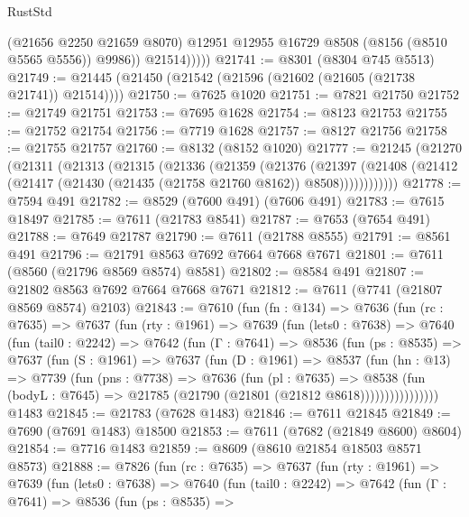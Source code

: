 \begin{lexlean}{RustStd}
\begin{coremodule}
                  (@21656 @2250 @21659 @8070)
                  @12951
                  @12955
                  @16729
                  @8508
                  (@8156 (@8510 @5565 @5556))
                  @9986))
              @21514)))))
@21741 := @8301 (@8304 @745 @5513)
@21749 := @21445 (@21450 (@21542 (@21596 (@21602 (@21605 (@21738 @21741)) @21514))))
@21750 := @7625 @1020
@21751 := @7821 @21750
@21752 := @21749 @21751
@21753 := @7695 @1628
@21754 := @8123 @21753
@21755 := @21752 @21754
@21756 := @7719 @1628
@21757 := @8127 @21756
@21758 := @21755 @21757
@21760 := @8132 (@8152 @1020)
@21777 := @21245
    (@21270
      (@21311
        (@21313
          (@21315
            (@21336
              (@21359
                (@21376
                  (@21397
                    (@21408 (@21412 (@21417 (@21430 (@21435 (@21758 @21760 @8162)) @8508))))))))))))
@21778 := @7594 @491
@21782 := @8529 (@7600 @491) (@7606 @491)
@21783 := @7615 @18497
@21785 := @7611 (@21783 @8541)
@21787 := @7653 (@7654 @491)
@21788 := @7649 @21787
@21790 := @7611 (@21788 @8555)
@21791 := @8561 @491
@21796 := @21791 @8563 @7692 @7664 @7668 @7671
@21801 := @7611 (@8560 (@21796 @8569 @8574) @8581)
@21802 := @8584 @491
@21807 := @21802 @8563 @7692 @7664 @7668 @7671
@21812 := @7611 (@7741 (@21807 @8569 @8574) @2103)
@21843 := @7610
    (fun (fn : @134) =>
    @7636
      (fun (rc : @7635) =>
      @7637
        (fun (rty : @1961) =>
        @7639
          (fun (lets0 : @7638) =>
          @7640
            (fun (tail0 : @2242) =>
            @7642
              (fun (Γ : @7641) =>
              @8536
                (fun (ps : @8535) =>
                @7637
                  (fun (S : @1961) =>
                  @7637
                    (fun (D : @1961) =>
                    @8537
                      (fun (hn : @13) =>
                      @7739
                        (fun (pns : @7738) =>
                        @7636
                          (fun (pl : @7635) =>
                          @8538
                            (fun (bodyL : @7645) =>
                            @21785 (@21790 (@21801 (@21812 @8618))))))))))))))))
    @1483
@21845 := @21783 (@7628 @1483)
@21846 := @7611 @21845
@21849 := @7690 (@7691 @1483) @18500
@21853 := @7611 (@7682 (@21849 @8600) @8604)
@21854 := @7716 @1483
@21859 := @8609 (@8610 @21854 @18503 @8571 @8573)
@21888 := @7826
    (fun (rc : @7635) =>
    @7637
      (fun (rty : @1961) =>
      @7639
        (fun (lets0 : @7638) =>
        @7640
          (fun (tail0 : @2242) =>
          @7642
            (fun (Γ : @7641) =>
            @8536
              (fun (ps : @8535) =>

\end{coremodule}
\end{lexlean}
